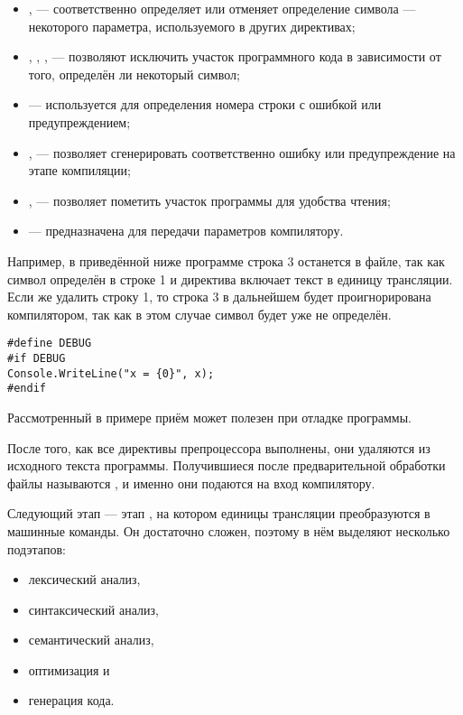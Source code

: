 \begin{itemize}
\item {},  — соответственно определяет или
  отменяет определение символа — некоторого параметра, используемого в
  других директивах;
\item {}, , ,  —
  позволяют исключить участок программного кода в зависимости от того,
  определён ли некоторый символ;
\item {} — используется для определения номера строки с
  ошибкой или предупреждением;
\item {},  — позволяет сгенерировать
  соответственно ошибку или предупреждение на этапе компиляции;
\item {},  — позволяет пометить участок
  программы для удобства чтения;
\item {} — предназначена для передачи параметров
  компилятору.
\end{itemize}

Например, в приведённой ниже программе строка 3 останется в файле, так
как символ  определён в строке 1 и директива
 включает текст в единицу трансляции. Если же удалить
строку 1, то строка 3 в дальнейшем будет проигнорирована компилятором,
так как в этом случае символ  будет уже не определён.

\begin{lstlisting}
#define DEBUG
#if DEBUG
Console.WriteLine("x = {0}", x);
#endif
\end{lstlisting}

Рассмотренный в примере приём может полезен при отладке программы.

После того, как все директивы препроцессора выполнены, они удаляются
из исходного текста программы. Получившиеся после предварительной
обработки файлы называются , и именно они подаются на вход компилятору.

Следующий этап — этап , на котором
единицы трансляции преобразуются в машинные команды. Он достаточно
сложен, поэтому в нём выделяют несколько подэтапов:

\begin{itemize}
\item лексический анализ,
\item синтаксический анализ,
\item семантический анализ,
\item оптимизация и
\item генерация кода.
\end{itemize}

